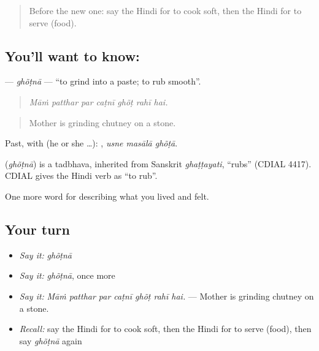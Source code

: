 \label{lesson:HI-C524-ghotna}



\begin{quote}
Before the new one: say the Hindi for to cook soft, then the Hindi for to serve (food).
\end{quote}

\subsection*{You'll want to know: }
\textbf{} — \emph{ghõṭnā} — \textquotedblleft{}to grind into a paste; to rub smooth\textquotedblright{}.

\begin{quote}
      
\end{quote}

\begin{quote}
\emph{Māṁ patthar par caṭnī ghõṭ rahī hai.}
\end{quote}

\begin{quote}
Mother is grinding chutney on a stone.
\end{quote}

Past, with  (he or she …):   , \emph{usne masālā ghõṭā}.

\begin{cousinweb}
\textbf{} (\emph{ghõṭnā}) is a tadbhava, inherited from Sanskrit \emph{ghaṭṭayati}, \textquotedblleft{}rubs\textquotedblright{} (CDIAL 4417). CDIAL gives the Hindi verb as \textquotedblleft{}to rub\textquotedblright{}.
\end{cousinweb}

\begin{grammarlens}[title={What you've built}]
One more word for describing what you lived and felt.
\end{grammarlens}

\subsection*{Your turn}
\begin{itemize}
\raggedright
  \item \emph{Say it:} \emph{ghõṭnā}
  \item \emph{Say it:} \emph{ghõṭnā}, once more
  \item \emph{Say it:} \emph{Māṁ patthar par caṭnī ghõṭ rahī hai.} — Mother is grinding chutney on a stone.
  \item \emph{Recall:} say the Hindi for to cook soft, then the Hindi for to serve (food), then say \emph{ghõṭnā} again
\end{itemize}

